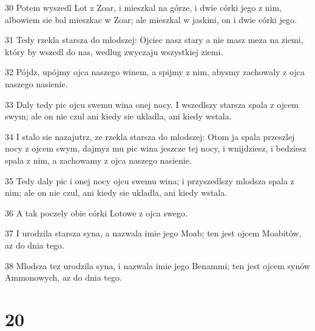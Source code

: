 \par 30 Potem wyszedl Lot z Zoar, i mieszkal na górze, i dwie córki jego z nim, albowiem sie bal mieszkac w Zoar; ale mieszkal w jaskini, on i dwie córki jego.
\par 31 Tedy rzekla starsza do mlodszej: Ojciec nasz stary a nie masz meza na ziemi, który by wszedl do nas, wedlug zwyczaju wszystkiej ziemi.
\par 32 Pójdz, upójmy ojca naszego winem, a spijmy z nim, abysmy zachowaly z ojca naszego nasienie.
\par 33 Daly tedy pic ojcu swemu wina onej nocy. I wszedlszy starsza spala z ojcem swym; ale on nie czul ani kiedy sie ukladla, ani kiedy wstala.
\par 34 I stalo sie nazajutrz, ze rzekla starsza do mlodszej: Otom ja spala przeszlej nocy z ojcem swym, dajmyz mu pic wina jeszcze tej nocy, i wnijdziesz, i bedziesz spala z nim, a zachowamy z ojca naszego nasienie.
\par 35 Tedy daly pic i onej nocy ojcu swemu wina; i przyszedlszy mlodsza spala z nim; ale on nie czul, ani kiedy sie ukladla, ani kiedy wstala.
\par 36 A tak poczely obie córki Lotowe z ojca swego.
\par 37 I urodzila starsza syna, a nazwala imie jego Moab; ten jest ojcem Moabitów, az do dnia tego.
\par 38 Mlodsza tez urodzila syna, i nazwala imie jego Benammi; ten jest ojcem synów Ammonowych, az do dnia tego.

\chapter{20}

